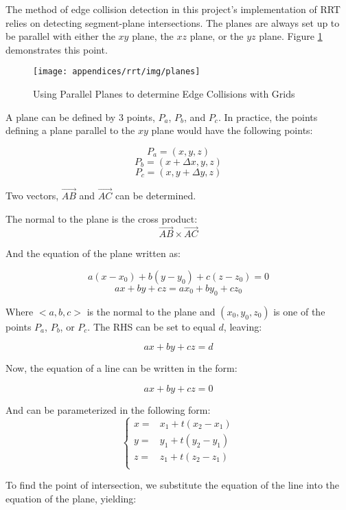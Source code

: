 The method of edge collision detection in this project's implementation of \gls{RRT} relies on detecting segment-plane intersections. The planes are always set up to be parallel with either the $xy$ plane, the $xz$ plane, or the $yz$ plane. Figure \ref{fig:parallelPlanes} demonstrates this point.

\begin{figure}[H]
\begin{centering}
\texttt{[image: appendices/rrt/img/planes]}
\caption{Using Parallel Planes to determine Edge Collisions with Grids}
\label{fig:parallelPlanes}
\end{centering}
\end{figure}

A plane can be defined by 3 points, $P_a$, $P_b$, and $P_c$. In practice, the points defining a plane parallel to the $xy$ plane would have the following points:

    $$P_a = (x,y,z)$$
    $$P_b = (x+\Delta x,y,z)$$
    $$P_c = (x,y+\Delta y,z)$$

Two vectors, $\vec{AB}$ and $\vec{AC}$ can be determined.

The normal to the plane is the cross product: 
    $$\vec{AB} \times \vec{AC}$$

And the equation of the plane written as:

    $$a(x-x_0) + b(y-y_0) + c(z-z_0) = 0$$
    $$ax + by + cz = ax_0 + by_0 + cz_0$$

Where $<a,b,c>$ is the normal to the plane and $(x_0, y_0, z_0)$ is one of the points $P_a$, $P_b$, or $P_c$.
The RHS can be set to equal $d$, leaving:

    $$ax + by + cz = d$$

Now, the equation of a line can be written in the form:

    $$ax + by + cz = 0$$

And can be parameterized in the following form:
    $$\begin{cases}
        x = & x_1 + t(x_2 - x_1) \\
        y = & y_1 + t(y_2 - y_1) \\
        z = & z_1 + t(z_2 - z_1) \\

    \end{cases}$$

To find the point of intersection, we substitute the equation of the line into the equation of the plane, yielding:

